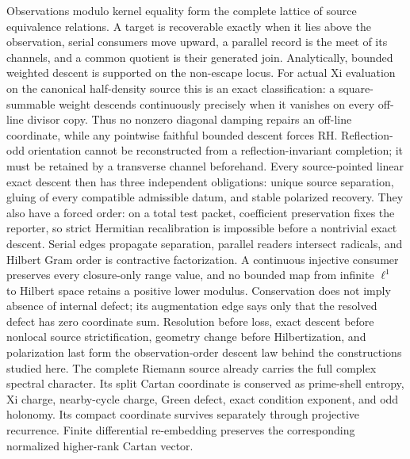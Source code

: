 \documentclass[11pt]{article}
\theoremstyle{definition}
\theoremstyle{remark}
\begin{document}
Observations modulo kernel equality form the complete lattice of source
equivalence relations.  A target is recoverable exactly when it lies above
the observation, serial consumers move upward, a parallel record is the meet
of its channels, and a common quotient is their generated join.  Analytically,
bounded weighted descent is supported on the non-escape locus.  For actual Xi
evaluation on the canonical half-density source this is an exact
classification: a square-summable weight descends continuously precisely
when it vanishes on every off-line divisor copy.  Thus no nonzero diagonal
damping repairs an off-line coordinate, while any pointwise faithful bounded
descent forces RH.  Reflection-odd orientation cannot be reconstructed from a
reflection-invariant completion; it must be retained by a transverse channel
beforehand.  Every
source-pointed linear exact descent then has three independent obligations:
unique source separation, gluing of every compatible admissible datum, and
stable polarized recovery.  They also have a forced order: on a total test
packet, coefficient preservation fixes the reporter, so strict Hermitian
recalibration is impossible before a nontrivial exact descent.  Serial edges
propagate separation, parallel readers intersect radicals, and Hilbert Gram
order is contractive factorization.  A continuous injective consumer
preserves every closure-only range value, and no bounded map from infinite
\(\ell^1\) to Hilbert space retains a positive lower modulus.  Conservation does not imply absence of internal defect; its
augmentation edge says only that the resolved defect has zero coordinate
sum.  Resolution before loss, exact descent before nonlocal source
strictification, geometry change before Hilbertization, and polarization
last form the observation-order descent law behind
the constructions studied here.  The complete Riemann source
already carries the full complex spectral character.  Its split Cartan
coordinate is conserved as prime-shell entropy, Xi charge, nearby-cycle
charge, Green defect, exact condition exponent, and odd holonomy.  Its
compact coordinate survives separately through projective recurrence.
Finite differential re-embedding preserves the corresponding normalized
higher-rank Cartan vector.
\end{document}
